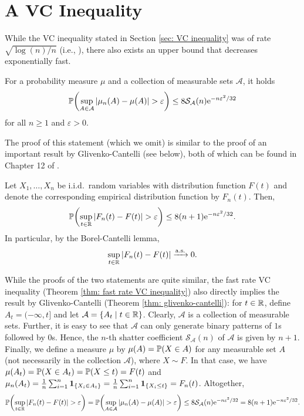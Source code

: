 \section{A  VC Inequality}

While the VC inequality stated in Section \ref{sec: VC inequality} was of rate $\sqrt{\log(n) / n}$ (i.e., ), there also exists an upper bound that decreases exponentially fast.

\begin{theorem}
\label{thm: fast rate VC inequality}
For a probability measure $\mu$ and a collection of measurable sets $\mathcal{A}$, it holds
\[
    \Prob\left(\sup_{A \in \mathcal{A}} \abs{\mu_n(A) - \mu(A)} > \varepsilon\right) \leq 8 \mathcal{S}_{\mathcal{A}}(n) \e^{-n \varepsilon^2 / 32}
\]
for all $n \geq 1$ and $\varepsilon > 0$.
\end{theorem}

The proof of this statement (which we omit) is similar to the proof of an important result by Glivenko-Cantelli (see below), both of which can be found in Chapter 12 of  \cite{devroye1996probabilistic}.

\begin{theorem}
\label{thm: glivenko-cantelli}
Let $X_1, \dots, X_n$ be i.i.d.\ random variables with distribution function $F(t)$ and denote the corresponding empirical distribution function by $F_n(t)$. Then,
\[
    \Prob\left(\sup_{t \in \R} \abs{F_n(t) - F(t)} > \varepsilon\right) \leq 8(n+1) \e^{-n \varepsilon^2 / 32}.
\]
In particular, by the Borel-Cantelli lemma,
\[
    \sup_{t \in \mathbb{R}} \abs{F_n(t) - F(t)} \xrightarrow{\mathrm{a.s.}} 0.
\]
\end{theorem}

\begin{remark}
While the proofs of the two statements are quite similar, the fast rate VC inequality (Theorem \ref{thm: fast rate VC inequality}) also directly implies the result by Glivenko-Cantelli (Theorem \ref{thm: glivenko-cantelli}): for $t \in \mathbb{R}$, define $A_t = (-\infty, t]$ and let $\mathcal{A} = \set{A_t \with t \in \R}$. Clearly, $\mathcal{A}$ is a collection of measurable sets. Further, it is easy to see that $\mathcal{A}$ can only generate binary patterns of $1$s followed by $0$s. Hence, the $n$-th shatter coefficient $\mathcal{S}_{\mathcal{A}}(n)$ of $\mathcal{A}$ is given by $n+1$. Finally, we define a measure $\mu$ by $\mu(A) = \operatorname{\mathbb{P}}(X \in A)$ for any measurable set $A$ (not necessarily in the collection $\mathcal{A}$), where $X \sim F$. In that case, we have $\mu(A_t) = \operatorname{\mathbb{P}}(X \in A_t) = \operatorname{\mathbb{P}}(X \leq t) = F(t)$ and $\mu_n(A_t) = \frac{1}{n} \sum_{i=1}^n \indSet{X_i \in A_t} = \frac{1}{n} \sum_{i=1}^n \indSet{X_i \leq t} = F_n(t)$. Altogether,
\[
    \Prob\left(\sup_{t \in \R} \abs{F_n(t) - F(t)} > \varepsilon\right) = \Prob\left(\sup_{A \in \mathcal{A}} \abs{\mu_n(A) - \mu(A)} > \varepsilon\right) \leq 8 \mathcal{S}_{\mathcal{A}}(n) \e^{-n \varepsilon^2 / 32} = 8(n+1)\e^{-n \varepsilon^2 / 32}.
\]
\end{remark}

